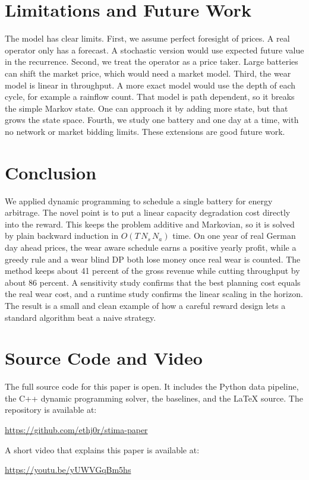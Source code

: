 \documentclass[conference,a4paper]{IEEEtran}
\begin{document}
\section{Limitations and Future Work}\label{sec:limit}
The model has clear limits. First, we assume perfect foresight of prices. A
real operator only has a forecast. A stochastic version would use expected
future value in the recurrence. Second, we treat the operator as a price
taker. Large batteries can shift the market price, which would need a market
model. Third, the wear model is linear in throughput. A more exact model would
use the depth of each cycle, for example a rainflow count. That model is path
dependent, so it breaks the simple Markov state. One can approach it by adding
more state, but that grows the state space. Fourth, we study one battery and
one day at a time, with no network or market bidding limits. These extensions
are good future work.

\section{Conclusion}\label{sec:conc}
We applied dynamic programming to schedule a single battery for energy
arbitrage. The novel point is to put a linear capacity degradation cost
directly into the reward. This keeps the problem additive and Markovian, so it
is solved by plain backward induction in $O(T\,N_s\,N_a)$ time. On one year of
real German day ahead prices, the wear aware schedule earns a positive yearly
profit, while a greedy rule and a wear blind DP both lose money once real wear
is counted. The method keeps about 41 percent of the gross revenue while
cutting throughput by about 86 percent. A sensitivity study confirms that the
best planning cost equals the real wear cost, and a runtime study confirms the
linear scaling in the horizon. The result is a small and clean example of how
a careful reward design lets a standard algorithm beat a naive strategy.

\appendices
\section{Source Code and Video}
The full source code for this paper is open. It includes the Python data
pipeline, the C++ dynamic programming solver, the baselines, and the LaTeX
source. The repository is available at:
\begin{center}
\url{https://github.com/ethj0r/stima-paper}
\end{center}
A short video that explains this paper is available at:
\begin{center}
\url{https://youtu.be/yUWVGqBm5hs}
\end{center}
\end{document}

